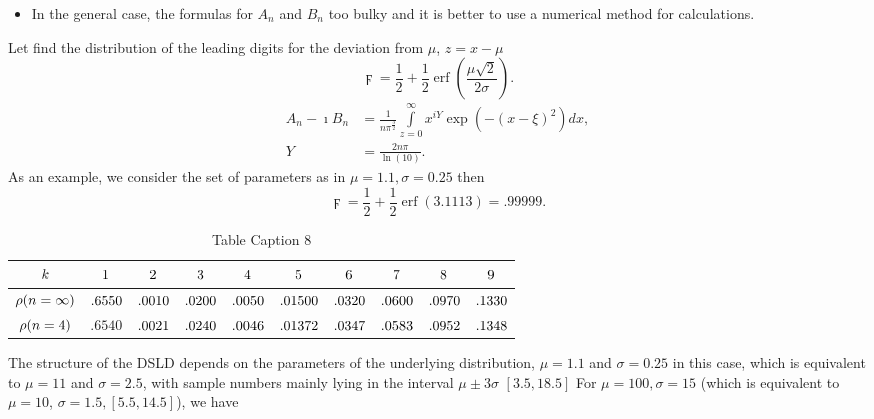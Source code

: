 \documentclass[titlepage,fleqn]{article}%
\begin{document}
\begin{itemize}
\item In the general case, the formulas for $A_{n}$ and $B_{n}$ too bulky and
it is better to use a numerical method for calculations.
\end{itemize}

Let find the distribution of the leading digits for the deviation from $\mu$,
$z=x-\mu$%
\[
\digamma=\frac{1}{2}+\frac{1}{2}\operatorname{erf}\left(  \frac{\mu\sqrt{2}%
}{2\sigma}\right)  .
\]%
\begin{align*}
A_{n}-\imath B_{n} &  =\frac{1}{n\pi^{\frac{3}{2}}}%
{\displaystyle\int\limits_{z=0}^{\infty}}
x^{iY}\exp\left(  -(x-\xi)^{2}\right)  dx,\\
Y &  =\frac{2n\pi}{\ln(10)}.
\end{align*}
As an example, we consider the set of parameters as in
\cite{formann0}
$\mu=1.1,\sigma=0.25$ then%
\[
\digamma=\frac{1}{2}+\frac{1}{2}\operatorname{erf}\left(  3.1113\right)
=.99999.
\]%
\begin{table}[!htbp] \centering
\begin{tabular}
[c]{|c|c|c|c|c|c|c|c|c|c|}\hline\hline
${\small k}$ & ${\small 1}$ & ${\small 2}$ & ${\small 3}$ & ${\small 4}$ &
${\small 5}$ & ${\small 6}$ & ${\small 7}$ & ${\small 8}$ & ${\small 9}%
$\\\hline
${\small \rho(n=\infty)}$ & ${\small .6550}$ & ${\small .0010}$ &
${\small .0200}$ & ${\small .0050}$ & ${\small .01500}$ & ${\small .0320}$ &
${\small .0600}$ & ${\small .0970}$ & ${\small .1330}$\\\hline
${\small \rho(n=4)}$ & {\small .}$6540$ & ${\small .0021}$ & ${\small .0240}$
& ${\small .0046}$ & ${\small .01372}$ & ${\small .0347}$ & ${\small .0583}$ &
${\small .0952}$ & ${\small .1348}$\\\hline\hline
\end{tabular}
\caption{Table Caption 8}\label{TableKey8}%
\end{table}%


\bigskip

The structure of the DSLD depends on the parameters of the underlying
distribution, $\mu=1.1$ and $\sigma=0.25$ in this case, which is equivalent to
$\mu=11$ and $\sigma=2.5$, with sample numbers mainly lying in the interval
$\mu\pm3\sigma$ $[3.5,18.5]$ For $\mu=100,\sigma=15$ (which is equivalent to
$\mu=10$, $\sigma=1.5,[5.5,14.5]$), we have
\end{document}
